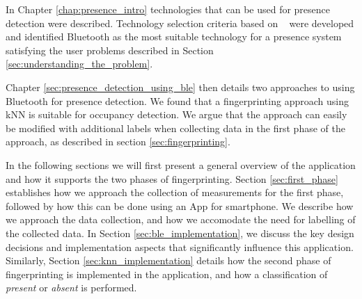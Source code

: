 In Chapter \ref{chap:presence_intro} technologies that can be used for presence detection were described. 
Technology selection criteria based on \citeauthor{presence_ble_review}~\cite{presence_ble_review} were developed and identified Bluetooth as the most suitable technology for a presence system satisfying the user problems described in Section \ref{sec:understanding_the_problem}.

Chapter \ref{sec:presence_detection_using_ble} then details two approaches to using Bluetooth for presence detection. 
We found that a fingerprinting approach using kNN is suitable for occupancy detection. 
We argue that the approach can easily be modified with additional labels when collecting data in the first phase of the approach, as described in section \ref{sec:fingerprinting}.

In the following sections we will first present a general overview of the application and how it supports the two phases of fingerprinting. 
Section \ref{sec:first_phase} establishes how we approach the collection of measurements for the first phase, followed by how this can be done using an App for smartphone. 
We describe how we approach the data collection, and how we accomodate the need for labelling of the collected data.
In Section \ref{sec:ble_implementation}, we discuss the key design decisions and implementation aspects that significantly influence this application.
Similarly, Section \ref{sec:knn_implementation} details how the second phase of fingerprinting is implemented in the application, and how a classification of \textit{present} or \textit{absent} is performed.



